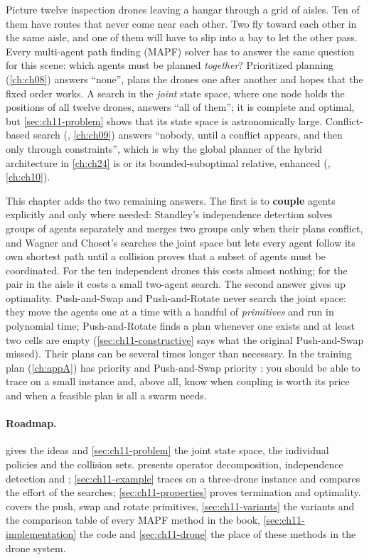 Picture twelve inspection drones leaving a hangar through a grid of aisles.
Ten of them have routes that never come near each other. Two fly toward
each other in the same aisle, and one of them will have to slip into a bay
to let the other pass. Every multi-agent path finding (MAPF) solver has to
answer the same question for this scene: which agents must be planned
\emph{together}? Prioritized planning (\cref{ch:ch08}) answers ``none'',
plans the drones one after another and hopes that the fixed order works. A
search in the \emph{joint} state space, where one node holds the positions
of all twelve drones, answers ``all of them''; it is complete and optimal,
but \cref{sec:ch11-problem} shows that its state space is astronomically
large. Conflict-based search (\cbs, \cref{ch:ch09}) answers ``nobody, until
a conflict appears, and then only through constraints'', which is why the
global planner of the hybrid architecture in \cref{ch:ch24} is \cbs or its
bounded-suboptimal relative, enhanced \cbs (\ecbs, \cref{ch:ch10}).

This chapter adds the two remaining answers. The first is to \textbf{couple}
agents explicitly and only where needed: Standley's independence detection
solves groups of agents separately and merges two groups only when their
plans conflict, and Wagner and Choset's \mstar searches the joint space but
lets every agent follow its own shortest path until a collision proves that
a subset of agents must be coordinated. For the ten independent drones this
costs almost nothing; for the pair in the aisle it costs a small two-agent
search. The second answer gives up optimality. Push-and-Swap and
Push-and-Rotate never search the joint space: they move the agents one at a
time with a handful of \emph{primitives} and run in polynomial time;
Push-and-Rotate finds a plan whenever one exists and at least two cells are
empty (\cref{sec:ch11-constructive} says what the original Push-and-Swap
missed). Their plans can be several times longer than necessary. In the training plan
(\cref{ch:appA}) \mstar has priority  and Push-and-Swap
priority : you should be able to trace \mstar on a small
instance and, above all, know when coupling is worth its price and when a
feasible plan is all a swarm needs.

\paragraph{Roadmap.}  gives the ideas and
\cref{sec:ch11-problem} the joint state space, the individual policies and
the collision sets.  presents operator
decomposition, independence detection and \mstar; \cref{sec:ch11-example}
traces \mstar on a three-drone instance and compares the effort of the
searches; \cref{sec:ch11-properties} proves termination and optimality.
 covers the push, swap and rotate primitives,
\cref{sec:ch11-variants} the variants and the comparison table of every
MAPF method in the book, \cref{sec:ch11-implementation} the code and
\cref{sec:ch11-drone} the place of these methods in the drone system.

